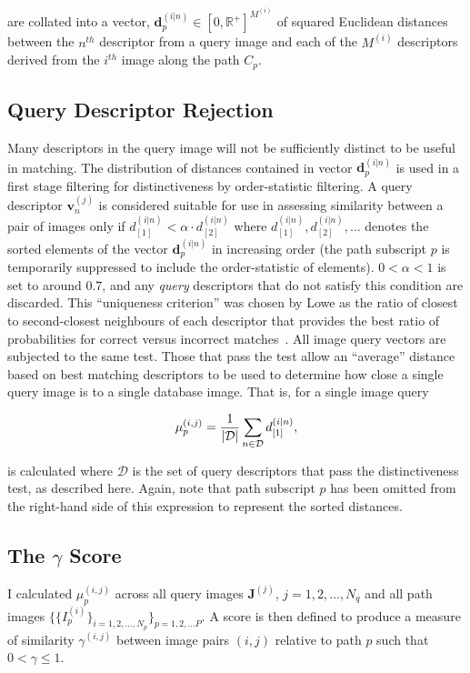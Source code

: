 are collated into a vector, $\mathbf{d}^{(i|n)}_p \in [0,\mathbb{R}^+]^{M^{(i)}}$ of squared Euclidean distances between the $n^{th}$ descriptor from a query image and each of the $M^{(i)}$ descriptors derived from the $i^{th}$ image along the path $C_p$. 

\subsection{Query Descriptor Rejection} \label{subsec:querydescrejection}
Many descriptors in the query image will not be sufficiently distinct to be useful in matching.  The distribution of distances contained in vector $\mathbf{d}^{(i|n)}_p$ is used in a first stage filtering for distinctiveness by order-statistic filtering.  A query descriptor $\mathbf{v}_n^{(j)}$ is considered suitable for use in assessing similarity between a pair of images only if $d^{(i|n)}_{[1]} < \alpha \cdot d^{(i|n)}_{[2]}$ where $d^{(i|n)}_{[1]}, d^{(i|n)}_{[2]},\ldots $ denotes the sorted elements of the vector $\mathbf{d}^{(i|n)}_p$ in increasing order (the path subscript $p$ is temporarily suppressed to include the order-statistic of elements).  $0<\alpha<1$ is set to around 0.7, and any \textit{query} descriptors that do not satisfy this condition are discarded. This ``uniqueness criterion'' was chosen by Lowe as the ratio of closest to second-closest neighbours of each descriptor that provides the best ratio of probabilities for correct versus incorrect matches~\cite{lowe2004distinctive}. All image query vectors are subjected to the same test.  Those that pass the test allow an ``average'' distance based on best matching descriptors to be used to determine how close a single query image is to a single database image. That is, for a single image query 

\begin{equation}
\centering
\mu^{(i,j)}_p=\frac{1}{|\mathcal{D}|}\sum_{n\in \mathcal{D}} d^{(i|n)}_{[1]},
\end{equation}

is calculated where $\mathcal{D}$ is the set of query descriptors that pass the distinctiveness test, as described here. Again, note that path subscript $p$ has been omitted from the right-hand side of this expression to represent the sorted distances.

\subsection{The $\gamma$ Score} I calculated  $\mu_p^{(i,j)}$ across all query images $\mathbf{J}^{(j)}$, $j=1,2,\ldots,N_q$ and all path images $\lbrace\lbrace I^{(i)}_p\rbrace_{i=1,2,\ldots,N_p}\rbrace_{p=1,2,\ldots P}$.   A score is then defined to produce a measure of similarity $\gamma^{(i,j)}$ between image pairs $(i,j)$ relative to path $p$ such that $0 < \gamma \le 1$. 


